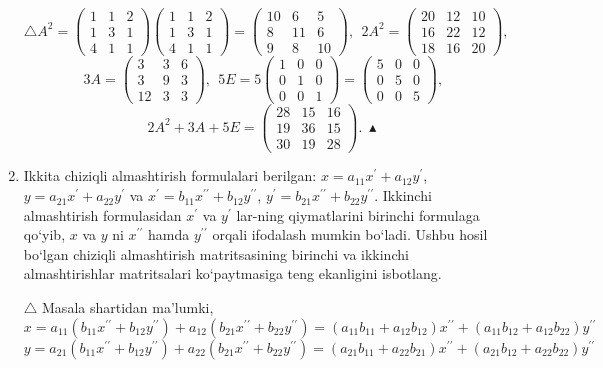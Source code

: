 \begin{enumerate}
$$\triangle A^2=\begin{pmatrix}
	1&1&2\\1&3&1\\4&1&1
\end{pmatrix}\begin{pmatrix}
1&1&2\\1&3&1\\4&1&1
\end{pmatrix}=\begin{pmatrix}
10&6&5\\8&11&6\\9&8&10
\end{pmatrix},\ \ 2A^2=\begin{pmatrix}
20&12&10\\16&22&12\\18&16&20
\end{pmatrix},$$
$$3A=\begin{pmatrix}
	3&3&6\\3&9&3\\12&3&3
\end{pmatrix},\ \ 5E=5\begin{pmatrix}
1&0&0\\0&1&0\\0&0&1
\end{pmatrix}=\begin{pmatrix}
5&0&0\\0&5&0\\0&0&5
\end{pmatrix},$$
$$2A^2+3A+5E=\begin{pmatrix}
	28&15&16\\19&36&15\\30&19&28
\end{pmatrix}.\ \blacktriangle$$

\item Ikkita chiziqli almashtirish formulalari berilgan: $x=a_{11}x^\prime+a_{12}y^\prime$, $y=a_{21}x^\prime+a_{22}y^\prime$ va $x^\prime=b_{11}x^{\prime\prime}+b_{12}y^{\prime\prime}$, $y^\prime=b_{21}x^{\prime\prime}+b_{22}y^{\prime\prime}$. Ikkinchi almashtirish formulasidan $x^\prime$ va $y^\prime$ lar-ning qiymatlarini birinchi formulaga qo`yib, $x$ va $y$ ni $x^{\prime\prime}$ hamda $y^{\prime\prime}$ orqali ifodalash mumkin bo`ladi. Ushbu hosil bo`lgan chiziqli almashtirish matritsasining birinchi va ikkinchi almashtirishlar matritsalari ko`paytmasiga teng ekanligini isbotlang.

$\triangle$
Masala shartidan ma'lumki,
$$x=a_{11}(b_{11}x^{\prime\prime}+b_{12}y^{\prime\prime})+a_{12}(b_{21}x^{\prime\prime}+b_{22}y^{\prime\prime})=(a_{11}b_{11}+a_{12}b_{12})x^{\prime\prime}+(a_{11}b_{12}+a_{12}b_{22})y^{\prime\prime}$$
$$y=a_{21}(b_{11}x^{\prime\prime}+b_{12}y^{\prime\prime})+a_{22}(b_{21}x^{\prime\prime}+b_{22}y^{\prime\prime})=(a_{21}b_{11}+a_{22}b_{21})x^{\prime\prime}+(a_{21}b_{12}+a_{22}b_{22})y^{\prime\prime}$$


\end{enumerate}
